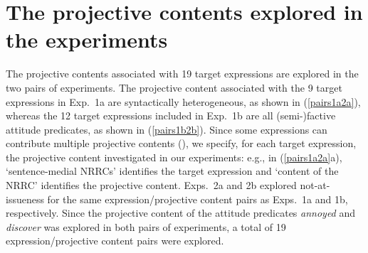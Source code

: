 \documentclass[11pt,fleqn]{article}
\newcommand{\6}{\mbox{$[\hspace*{-.6mm}[$}}
\newcommand{\9}{\mbox{$]\hspace*{-.6mm}]$}}
\begin{document}
\section{The projective contents explored in the experiments}\label{s2}

The projective contents associated with 19 target expressions are explored in the two pairs of experiments. The projective content associated with the 9 target expressions in Exp.~1a are syntactically heterogeneous, as shown in (\ref{pairs1a2a}), whereas the 12 target expressions included in Exp.~1b are all (semi-)factive attitude predicates, as shown in (\ref{pairs1b2b}). Since some expressions can contribute multiple projective contents (\citealt{brst-lang11}), we specify, for each target expression, the projective content investigated in our experiments: e.g., in (\ref{pairs1a2a}a), `sentence-medial NRRCs' identifies the target expression and `content of the NRRC' identifies the projective content. Exps.~2a and 2b explored not-at-issueness for the same expression/projective content pairs as Exps.~1a and 1b, respectively. Since the projective content of the attitude predicates {\em annoyed} and {\em discover} was explored in both pairs of experiments, a total of 19 expression/projective content pairs were explored. 
\end{document}

